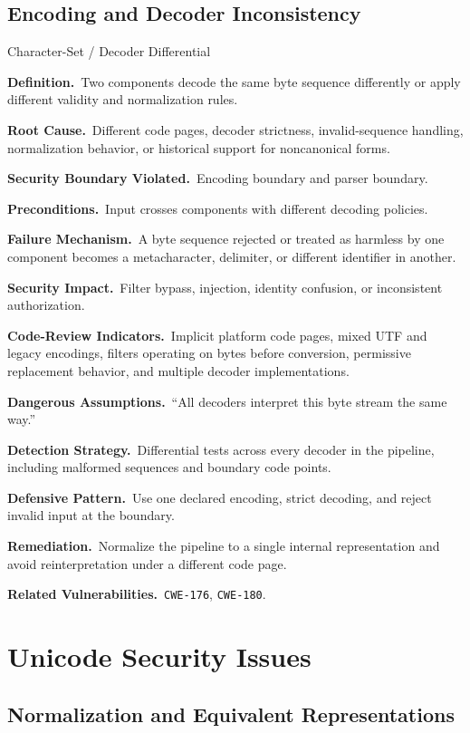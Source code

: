 \documentclass[11pt]{article}
\newcommand{\field}[1]{\par\smallskip\noindent\textbf{#1.}\ }
\newcommand{\cwe}[1]{\texttt{#1}}
\begin{document}
\subsection{Encoding and Decoder Inconsistency}

\begin{catalogbox}{Character-Set / Decoder Differential}
\field{Definition}Two components decode the same byte sequence differently or apply different validity and normalization rules.

\field{Root Cause}Different code pages, decoder strictness, invalid-sequence handling, normalization behavior, or historical support for noncanonical forms.

\field{Security Boundary Violated}Encoding boundary and parser boundary.

\field{Preconditions}Input crosses components with different decoding policies.

\field{Failure Mechanism}A byte sequence rejected or treated as harmless by one component becomes a metacharacter, delimiter, or different identifier in another.

\field{Security Impact}Filter bypass, injection, identity confusion, or inconsistent authorization.

\field{Code-Review Indicators}Implicit platform code pages, mixed UTF and legacy encodings, filters operating on bytes before conversion, permissive replacement behavior, and multiple decoder implementations.

\field{Dangerous Assumptions}``All decoders interpret this byte stream the same way.''

\field{Detection Strategy}Differential tests across every decoder in the pipeline, including malformed sequences and boundary code points.

\field{Defensive Pattern}Use one declared encoding, strict decoding, and reject invalid input at the boundary.

\field{Remediation}Normalize the pipeline to a single internal representation and avoid reinterpretation under a different code page.

\field{Related Vulnerabilities}\cwe{CWE-176}, \cwe{CWE-180}.
\end{catalogbox}

\section{Unicode Security Issues}

\subsection{Normalization and Equivalent Representations}
\end{document}
